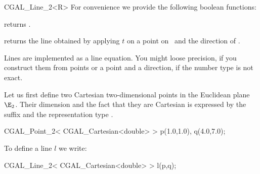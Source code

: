 \begin{ccClassTemplate} {CGAL_Line_2<R>}
For convenience we provide the following boolean functions:

       {}

       {returns .}

       {}

       {}

       {returns the line obtained by applying $t$ on a point on \ccVar\ 
        and the direction of \ccVar.}


\ccImplementation

Lines are implemented as a line equation. You might loose precision,
if you construct them from points or a point and a direction, if the
number type is not exact.

\ccExample
Let us first define two Cartesian two-dimensional points in the Euclidean 
plane $\E_2$. Their
dimension and the fact that they are Cartesian is expressed by
the suffix  and the representation type .

\begin{cprog}

  CGAL_Point_2< CGAL_Cartesian<double> >  p(1.0,1.0), q(4.0,7.0);
\end{cprog} 

To define a line $l$ we write:

\begin{cprog}

  CGAL_Line_2< CGAL_Cartesian<double> > l(p,q);
\end{cprog} 


\end{ccClassTemplate} 

%
%
%
